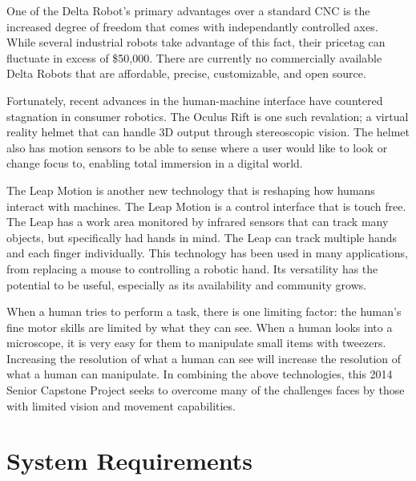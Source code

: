 \documentclass[11pt]{report}
\begin{document}
\par One of the Delta Robot's primary advantages over a standard CNC is the increased degree of freedom that comes with independantly controlled axes. While several industrial robots take advantage of this fact, their pricetag can fluctuate in excess of \$50,000. There are currently no commercially available Delta Robots that are affordable, precise, customizable, and open source.

\par Fortunately, recent advances in the human-machine interface have countered stagnation in consumer robotics. The Oculus Rift is one such revalation; a virtual reality helmet that can handle 3D output through stereoscopic vision. The helmet also has motion sensors to be able to sense where a user would like to look or change focus to, enabling total immersion in a digital world.

\par The Leap Motion is another new technology that is reshaping how humans interact with machines. The Leap Motion is a control interface that is touch free. The Leap has a work area monitored by infrared sensors that can track many objects, but specifically had hands in mind. The Leap can track multiple hands and each finger individually. This technology has been used in many applications, from replacing a mouse to controlling a robotic hand. Its versatility has the potential to be useful, especially as its availability and community grows.

\par When a human tries to perform a task, there is one limiting factor: the human's fine motor skills are limited by what they can see. When a human looks into a microscope, it is very easy for them to manipulate small items with tweezers. Increasing the resolution of what a human can see will increase the resolution of what a human can manipulate. In combining the above technologies, this 2014 Senior Capstone Project seeks to overcome many of the challenges faces by those with limited vision and movement capabilities.

\section{System Requirements}
\end{document}
